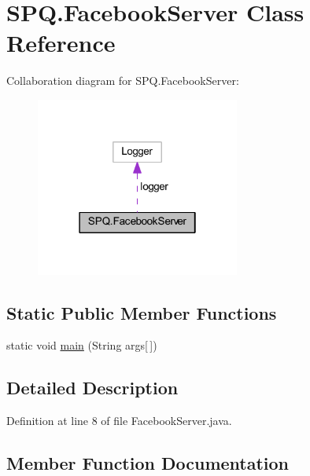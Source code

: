 \hypertarget{class_s_p_q_1_1_facebook_server}{}\section{S\+P\+Q.\+Facebook\+Server Class Reference}
\label{class_s_p_q_1_1_facebook_server}


Collaboration diagram for S\+P\+Q.\+Facebook\+Server\+:\nopagebreak
\begin{figure}[H]
\begin{center}
\leavevmode
\includegraphics[width=190pt]{class_s_p_q_1_1_facebook_server__coll__graph}
\end{center}
\end{figure}
\subsection*{Static Public Member Functions}
\begin{DoxyCompactItemize}
\item 
static void \mbox{\hyperlink{class_s_p_q_1_1_facebook_server_aa8376542eaad78cc8894afbcc1dfc205}{main}} (String args\mbox{[}$\,$\mbox{]})
\end{DoxyCompactItemize}


\subsection{Detailed Description}


Definition at line 8 of file Facebook\+Server.\+java.



\subsection{Member Function Documentation}
\mbox{\label{class_s_p_q_1_1_facebook_server_aa8376542eaad78cc8894afbcc1dfc205}} 
